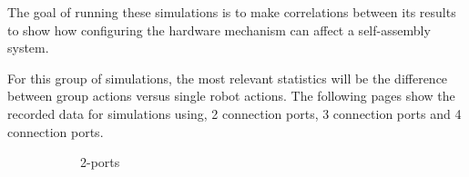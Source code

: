 The goal of running these simulations is to make correlations between its results to show how configuring the hardware mechanism can affect a self-assembly system.
 
For this group of simulations, the most relevant statistics will be the difference between group actions versus single robot actions.
The following pages show the recorded data for simulations using, 2 connection ports, 3 connection ports and 4 connection ports.


\begin{figure}[H]
	\centering
	\begin{subfigure}[b]{0.31\textwidth}
		\centering
		\caption{2-ports}
	\end{subfigure}
	\begin{subfigure}[b]{0.31\textwidth}
		\centering

\end{subfigure}
\end{figure}
